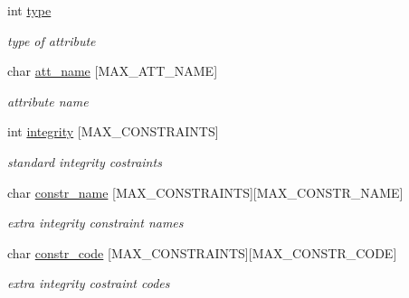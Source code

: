 \begin{DoxyCompactItemize}
\item 
int \hyperlink{structAK__header_a88b9d916b6efa4ba9408ead73ad5bd02}{type}\hypertarget{structAK__header_a88b9d916b6efa4ba9408ead73ad5bd02}{}\label{structAK__header_a88b9d916b6efa4ba9408ead73ad5bd02}

\begin{DoxyCompactList}\small\item\em type of attribute \end{DoxyCompactList}\item 
char \hyperlink{structAK__header_aa0d9f18802106957caa6661e4661d0d5}{att\+\_\+name} \mbox{[}M\+A\+X\+\_\+\+A\+T\+T\+\_\+\+N\+A\+ME\mbox{]}\hypertarget{structAK__header_aa0d9f18802106957caa6661e4661d0d5}{}\label{structAK__header_aa0d9f18802106957caa6661e4661d0d5}

\begin{DoxyCompactList}\small\item\em attribute name \end{DoxyCompactList}\item 
int \hyperlink{structAK__header_a1a420a74bf00556e0258e963e5021e28}{integrity} \mbox{[}M\+A\+X\+\_\+\+C\+O\+N\+S\+T\+R\+A\+I\+N\+TS\mbox{]}\hypertarget{structAK__header_a1a420a74bf00556e0258e963e5021e28}{}\label{structAK__header_a1a420a74bf00556e0258e963e5021e28}

\begin{DoxyCompactList}\small\item\em standard integrity costraints \end{DoxyCompactList}\item 
char \hyperlink{structAK__header_aafa6aa96730559127dd491f7aef8f85c}{constr\+\_\+name} \mbox{[}M\+A\+X\+\_\+\+C\+O\+N\+S\+T\+R\+A\+I\+N\+TS\mbox{]}\mbox{[}M\+A\+X\+\_\+\+C\+O\+N\+S\+T\+R\+\_\+\+N\+A\+ME\mbox{]}\hypertarget{structAK__header_aafa6aa96730559127dd491f7aef8f85c}{}\label{structAK__header_aafa6aa96730559127dd491f7aef8f85c}

\begin{DoxyCompactList}\small\item\em extra integrity constraint names \end{DoxyCompactList}\item 
char \hyperlink{structAK__header_af41ddb22d1a06285bc4a74d8be3d66b6}{constr\+\_\+code} \mbox{[}M\+A\+X\+\_\+\+C\+O\+N\+S\+T\+R\+A\+I\+N\+TS\mbox{]}\mbox{[}M\+A\+X\+\_\+\+C\+O\+N\+S\+T\+R\+\_\+\+C\+O\+DE\mbox{]}\hypertarget{structAK__header_af41ddb22d1a06285bc4a74d8be3d66b6}{}\label{structAK__header_af41ddb22d1a06285bc4a74d8be3d66b6}

\begin{DoxyCompactList}\small\item\em extra integrity costraint codes \end{DoxyCompactList}\end{DoxyCompactItemize}


